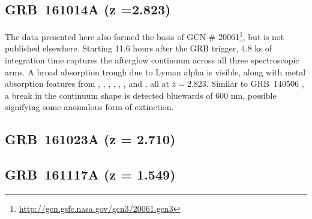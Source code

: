 \documentclass{aa}    %
\begin{document}
\subsection{GRB~161014A (z =2.823)}
The data presented here also formed the basis of GCN \#
20061\footnote{\url{http://gcn.gsfc.nasa.gov/gcn3/20061.gcn3}}, but is not
published elsewhere. Starting 11.6 hours after the GRB trigger, 4.8 ks of
integration time captures the afterglow continuum across all three
spectroscopic arms. A broad absorption trough due to Lyman alpha is visible,
along with metal absorption features from \mgii, \SIii, \cii, \civ, \alii,
\aliii, and	\feii, all at $z =2.823$. Similar to GRB~140506 \citep{Fynbo2014}, a
break in the continuum shape is detected bluewards of 600 nm, possible
signifying some anomalous form of extinction.


\subsection{GRB~161023A (z = 2.710)}	


\subsection{GRB~161117A (z = 1.549)}	
\end{document}
